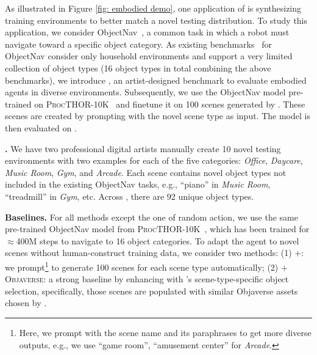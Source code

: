 As illustrated in Figure \ref{fig: embodied demo}, one application of \holodeck is synthesizing training environments to better match a novel testing distribution. To study this application, we consider ObjectNav~\cite{batra2020objectnav}, a common task in which a robot must navigate toward a specific object category. As existing benchmarks~\cite{deitke2020robothor, procthor,ramakrishnan2021hm3d} for ObjectNav consider only household environments and support a very limited collection of object types (16 object types in total combining the above benchmarks), we introduce \noveltythor, an artist-designed benchmark to evaluate embodied agents in diverse environments. Subsequently, we use the ObjectNav model pre-trained on \textsc{ProcTHOR-10K}~\cite{ai2thor} and finetune it on 100 scenes generated by \holodeck. These scenes are created by prompting \holodeck with the novel scene type as input. The model is then evaluated on \noveltythor.

\smallbreak
\noindent \textbf{\noveltythor.} We have two professional digital artists manually create 10 novel testing environments with two examples for each of the five categories: \textit{Office}, \textit{Daycare}, \textit{Music Room}, \textit{Gym}, and \textit{Arcade}. 
Each scene contains novel object types not included in the existing ObjectNav tasks, e.g., ``piano'' in \textit{Music Room}, ``treadmill'' in \textit{Gym}, etc. Across \noveltythor, there are 92 unique object types.
\smallbreak

\noindent \textbf{Baselines.} For all methods except the one of random action, we use the same pre-trained ObjectNav model from \textsc{ProcTHOR-10K}~\cite{ai2thor}, which has been trained for ${\approx}$400M steps to navigate to 16 object categories. %
To adapt the agent to novel scenes without human-construct training data, we consider two methods: (1) $+$\holodeck: we prompt\footnote{Here, we prompt with the scene name and its paraphrases to get more diverse outputs, e.g., we use ``game room'', ``amusement center'' for \textit{Arcade}.} \holodeck to generate 100 scenes for each scene type automatically; (2) $+$\textsc{Objaverse}: a strong baseline by enhancing \procthor with \holodeck's scene-type-specific object selection, specifically, those scenes are populated with similar Objaverse assets chosen by \holodeck.

